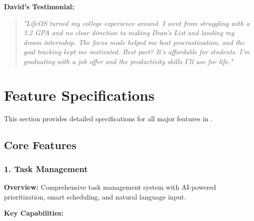 \textbf{David's Testimonial:}
\begin{quote}
\textit{"LifeOS turned my college experience around. I went from struggling with a 3.2 GPA and no clear direction to making Dean's List and landing my dream internship. The focus mode helped me beat procrastination, and the goal tracking kept me motivated. Best part? It's affordable for students. I'm graduating with a job offer and the productivity skills I'll use for life."}
\end{quote}

\section{Feature Specifications}

This section provides detailed specifications for all major features in \lifeos{}.

\subsection{Core Features}

\subsubsection{1. Task Management}

\textbf{Overview:}
Comprehensive task management system with AI-powered prioritization, smart scheduling, and natural language input.

\textbf{Key Capabilities:}

